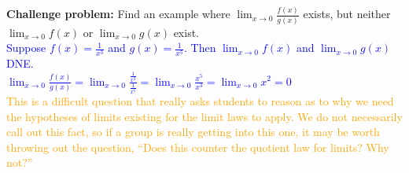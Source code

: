 \documentclass{ximera}
\begin{document}
\begin{exercise}
     \textbf{Challenge problem: }Find an example where $\displaystyle \lim_{x\rightarrow 0} \frac{f(x)}{g(x)}$ exists, but neither $\displaystyle\lim_{x\rightarrow 0}f(x)$ or $\displaystyle \lim_{x\rightarrow 0}g(x)$ exist.\\
     \textcolor{blue}{ Suppose $f(x)=\frac{1}{x^3}$ and $g(x)=\frac{1}{x^5}$.  Then $\lim_{x\rightarrow 0}f(x)$ and $\lim_{x\rightarrow 0}g(x)$ DNE.\\
 $\displaystyle\lim_{x\rightarrow 0}\frac{f(x)}{g(x)}=\lim_{x\rightarrow 0}\frac{\frac{1}{x^3}}{\frac{1}{x^5}}=\lim_{x\rightarrow 0}\frac{x^5}{x^3}=\lim_{x\rightarrow 0}x^2=0$ }\\
 \textcolor{orange}{This is a difficult question that really asks students to reason as to why we need the hypotheses of limits existing for the limit laws to apply. We do not necessarily call out this fact, so if a group is really getting into this one, it may be worth throwing out the question, ``Does this counter the quotient law for limits?  Why not?''}
\end{exercise}
\end{document}
